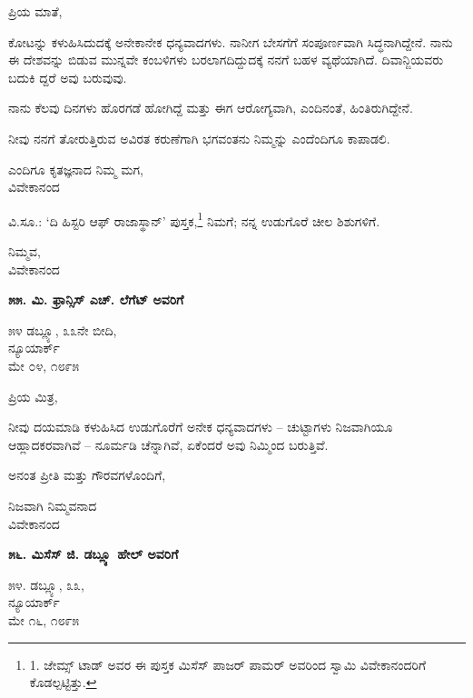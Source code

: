 ಪ್ರಿಯ ಮಾತೆ,

ಕೋಟನ್ನು ಕಳುಹಿಸಿದುದಕ್ಕೆ ಅನೇಕಾನೇಕ ಧನ್ಯವಾದಗಳು. ನಾನೀಗ ಬೇಸಗೆಗೆ ಸಂಪೂರ್ಣವಾಗಿ ಸಿದ್ಧನಾಗಿದ್ದೇನೆ. ನಾನು ಈ ದೇಶವನ್ನು ಬಿಡುವ ಮುನ್ನವೇ ಕಂಬಳಿಗಳು ಬರಲಾಗದಿದ್ದುದಕ್ಕೆ ನನಗೆ ಬಹಳ ವ್ಯಥೆಯಾಗಿದೆ. ದಿವಾನ್ಜಿಯವರು ಬದುಕಿ ದ್ದರೆ ಅವು ಬರುವುವು.

ನಾನು ಕೆಲವು ದಿನಗಳು ಹೊರಗಡೆ ಹೋಗಿದ್ದೆ ಮತ್ತು ಈಗ ಆರೋಗ್ಯವಾಗಿ, ಎಂದಿನಂತೆ, ಹಿಂತಿರುಗಿದ್ದೇನೆ.

ನೀವು ನನಗೆ ತೋರುತ್ತಿರುವ ಅವಿರತ ಕರುಣೆಗಾಗಿ ಭಗವಂತನು ನಿಮ್ಮನ್ನು ಎಂದೆಂದಿಗೂ ಕಾಪಾಡಲಿ.

\begin{flushright}
ಎಂದಿಗೂ ಕೃತಜ್ಞನಾದ ನಿಮ್ಮ ಮಗ,\\ವಿವೇಕಾನಂದ
\end{flushright}

ವಿ.ಸೂ.: ‘ದಿ ಹಿಸ್ಟರಿ ಆಫ್ ರಾಜಾಸ್ಥಾನ್’ ಪುಸ್ತಕ,\footnote{1. ಜೇಮ್ಸ್ ಟಾಡ್ ಅವರ ಈ ಪುಸ್ತಕ ಮಿಸೆಸ್ ಪಾಜರ್ ಪಾಮರ್ ಅವರಿಂದ ಸ್ವಾಮಿ ವಿವೇಕಾನಂದರಿಗೆ ಕೊಡಲ್ಪಟ್ಟಿತ್ತು.} ನಿಮಗೆ; ನನ್ನ ಉಡುಗೊರೆ ಚೀಲ ಶಿಶುಗಳಿಗೆ.

\begin{flushright}
ನಿಮ್ಮವ,\\ವಿವೇಕಾನಂದ
\end{flushright}

\begin{center}
\textbf{೫೫. ಮಿ. ಫ್ರಾನ್ಸಿಸ್ ಎಚ್. ಲೆಗೆಟ್ ಅವರಿಗೆ}
\end{center}

\begin{flushright}
೫೪ ಡಬ್ಲ್ಯೂ, ೩೩ನೇ ಬೀದಿ,\\ನ್ಯೂಯಾರ್ಕ್\\ಮೇ ೦೪, ೧೮೯೫
\end{flushright}

ಪ್ರಿಯ ಮಿತ್ರ,

ನೀವು ದಯಮಾಡಿ ಕಳುಹಿಸಿದ ಉಡುಗೊರೆಗೆ ಅನೇಕ ಧನ್ಯವಾದಗಳು – ಚುಟ್ಟಾಗಳು ನಿಜವಾಗಿಯೂ ಆಹ್ಲಾದಕರವಾಗಿವೆ – ನೂರ್ಮಡಿ ಚೆನ್ನಾಗಿವೆ, ಏಕೆಂದರೆ ಅವು ನಿಮ್ಮಿಂದ ಬರುತ್ತಿವೆ.

ಅನಂತ ಪ್ರೀತಿ ಮತ್ತು ಗೌರವಗಳೊಂದಿಗೆ,

\begin{flushright}
ನಿಜವಾಗಿ ನಿಮ್ಮವನಾದ\\ವಿವೇಕಾನಂದ
\end{flushright}

\begin{center}
\textbf{೫೬. ಮಿಸೆಸ್ ಜಿ. ಡಬ್ಲ್ಯೂ ಹೇಲ್ ಅವರಿಗೆ}
\end{center}

\begin{flushright}
೫೪. ಡಬ್ಲ್ಯೂ, ೩೩,\\ನ್ಯೂಯಾರ್ಕ್\\ಮೇ ೧೬, ೧೮೯೫
\end{flushright}

